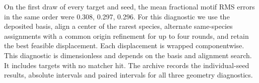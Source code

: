 On the first draw of every target and seed, the mean fractional motif RMS errors in the same order were 0.308, 0.297, 0.296. For this diagnostic we use the deposited basis, align a center of the rarest species, alternate same-species assignments with a common origin refinement for up to four rounds, and retain the best feasible displacement. Each displacement is wrapped componentwise. This diagnostic is dimensionless and depends on the basis and alignment search. It includes targets with no matcher hit. The archive records the individual-seed results, absolute intervals and paired intervals for all three geometry diagnostics.
